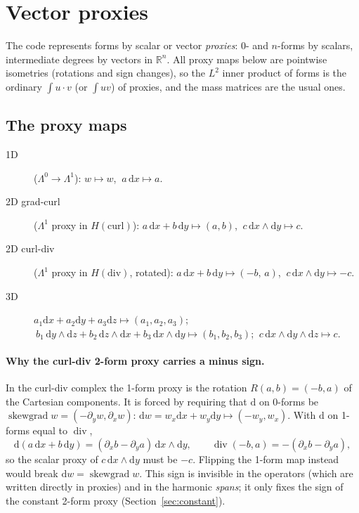 \documentclass[11pt]{article}
\newcommand{\dd}{\mathrm{d}}
\newcommand{\R}{\mathbb{R}}
\newcommand{\skewgrad}{\operatorname{skewgrad}}
\renewcommand{\div}{\operatorname{div}}
\theoremstyle{remark}
\begin{document}
\section{Vector proxies}\label{sec:proxies}

The code represents forms by scalar or vector \emph{proxies}: $0$- and $n$-forms by scalars,
intermediate degrees by vectors in $\R^n$. All proxy maps below are pointwise isometries
(rotations and sign changes), so the $L^2$ inner product of forms is the ordinary
$\int u\cdot v$ (or $\int uv$) of proxies, and the mass matrices are the usual ones.

\subsection{The proxy maps}

\begin{description}
\item[1D] ($\Lambda^0\to\Lambda^1$): $w\mapsto w$, $\ a\,\dd x\mapsto a$.
\item[2D grad-curl] ($\Lambda^1$ proxy in $H(\mathrm{curl})$):
  $a\,\dd x+b\,\dd y\mapsto (a,b)$, $\ c\,\dd x\wedge\dd y\mapsto c$.
\item[2D curl-div] ($\Lambda^1$ proxy in $H(\mathrm{div})$, rotated):
  $a\,\dd x+b\,\dd y\mapsto (-b,\,a)$, $\ c\,\dd x\wedge\dd y\mapsto -c$.
\item[3D] $a_1\dd x+a_2\dd y+a_3\dd z\mapsto(a_1,a_2,a_3)$;
  $\ b_1\,\dd y\wedge\dd z+b_2\,\dd z\wedge\dd x+b_3\,\dd x\wedge\dd y\mapsto(b_1,b_2,b_3)$;
  $\ c\,\dd x\wedge\dd y\wedge\dd z\mapsto c$.
\end{description}

\paragraph{Why the curl-div 2-form proxy carries a minus sign.} In the curl-div complex the
1-form proxy is the rotation $R(a,b)=(-b,a)$ of the Cartesian components. It is forced by
requiring that $\dd$ on 0-forms be $\skewgrad w = (-\partial_y w,\partial_x w)$:
$\dd w = w_x\dd x+w_y\dd y\mapsto(-w_y,w_x)$. With $\dd$ on 1-forms equal to $\div$,
\[
  \dd(a\,\dd x+b\,\dd y) = (\partial_x b-\partial_y a)\,\dd x\wedge\dd y,
  \qquad \div(-b,a) = -(\partial_x b - \partial_y a),
\]
so the scalar proxy of $c\,\dd x\wedge\dd y$ must be $-c$. Flipping the 1-form map instead
would break $\dd w=\skewgrad w$. This sign is invisible in the operators (which are written
directly in proxies) and in the harmonic \emph{spans}; it only fixes the sign of the constant
2-form proxy (Section~\ref{sec:constant}).
\end{document}
